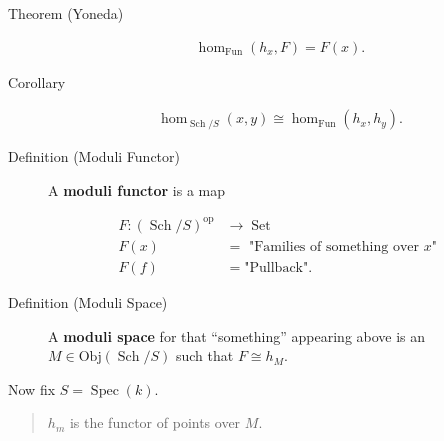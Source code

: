 \begin{description}
\item[Theorem (Yoneda)]
\begin{align*}\hom_{{\operatorname{Fun}}}(h_x, F) = F(x).\end{align*}
\item[Corollary]
\begin{align*}\hom_{{\operatorname{Sch}}/S}(x, y) \cong \hom_{{\operatorname{Fun}}}(h_x, h_y).\end{align*}
\item[Definition (Moduli Functor)]
A \textbf{moduli functor} is a map

\begin{align*} F: ({\operatorname{Sch}}/S)^\operatorname{op}&\to {\operatorname{Set}}\\ F(x) &= \text{ "Families of something over $x$" } \\ F(f) &= \text{"Pullback"} .\end{align*}
\item[Definition (Moduli Space)]
A \textbf{moduli space} for that ``something'' appearing above is an
\(M \in \mathrm{Obj}({\operatorname{Sch}}/S)\) such that
\(F \cong h_M\).
\end{description}

Now fix \(S = \operatorname{Spec}(k)\).

\begin{quote}
\(h_m\) is the functor of points over \(M\).
\end{quote}

